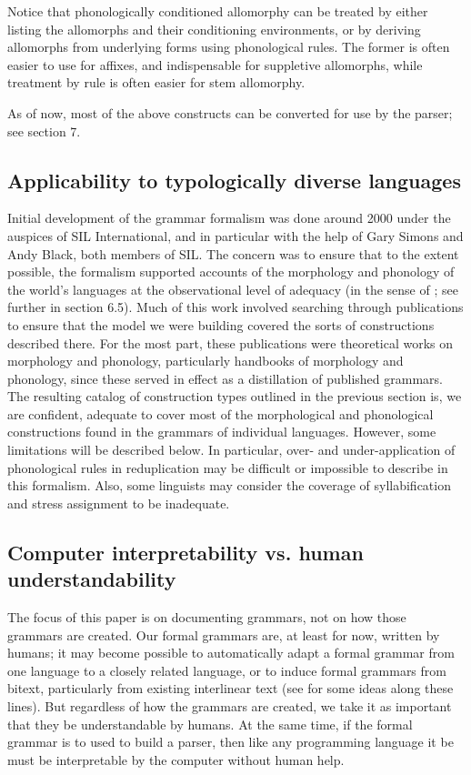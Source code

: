 Notice that phonologically conditioned allomorphy can be treated by either listing the allomorphs and their conditioning environments, or by deriving allomorphs from underlying forms using phonological rules. The former is often easier to use for affixes, and indispensable for suppletive allomorphs, while treatment by rule is often easier for stem allomorphy.

As of now, most of the above constructs can be converted for use by the parser; see section 7. 

\subsection{Applicability to typologically diverse languages}
Initial development of the grammar formalism was done around 2000 under the auspices of SIL International, and in particular with the help of Gary Simons and Andy Black, both members of SIL. The concern was to ensure that to the extent possible, the formalism supported accounts of the morphology and phonology of the world's languages at the observational level of adequacy (in the sense of \citet{Chomsky1965}; see further in section 6.5). Much of this work involved searching through publications to ensure that the model we were building covered the sorts of constructions described there. For the most part, these publications were theoretical works on morphology and phonology, particularly handbooks of morphology and phonology, since these served in effect as a distillation of published grammars. The resulting catalog of construction types outlined in the previous section is, we are confident, adequate to cover most of the morphological and phonological constructions found in the grammars of individual languages. However, some limitations will be described below. In particular, over- and under-application of phonological rules in reduplication may be difficult or impossible to describe in this formalism. Also, some linguists may consider the coverage of syllabification and stress assignment to be inadequate.

\subsection{Computer interpretability vs. human understandability}
The focus of this paper is on documenting grammars, not on how those grammars are created. Our formal grammars are, at least for now, written by humans; it may become possible to automatically adapt a formal grammar from one language to a closely related language, or to induce formal grammars from bitext, particularly from existing interlinear text (see \citet{LewisEtAl2008} for some ideas along these lines). But regardless of how the grammars are created, we take it as important that they be understandable by humans. At the same time, if the formal grammar is to used to build a parser, then  like any programming language it be must be interpretable by the computer without human help.

